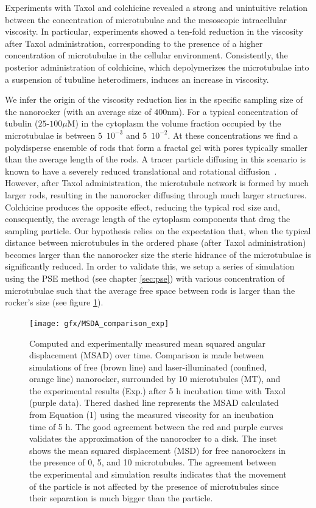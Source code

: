 \documentclass[ twoside,openright,titlepage,numbers=noenddot,%
headinclude,footinclude,cleardoublepage=empty,abstract=on,
BCOR=5mm,paper=b5,fontsize=11pt, dvipsnames
]{scrreprt}
\begin{document}
Experiments with Taxol and colchicine revealed a strong and unintuitive relation between the concentration of microtubulae and the mesoscopic intracellular viscosity. In particular, experiments showed a ten-fold reduction in the viscosity after Taxol administration, corresponding to the presence of a higher concentration of microtubulae in the cellular environment. Consistently, the posterior administration of colchicine, which depolymerizes the microtubulae into a suspension of tubuline heterodimers, induces an increase in viscosity.

We infer the origin of the viscosity reduction lies in the specific sampling size of the nanorocker (with an average size of $400$nm). For a typical concentration of tubulin ($25$-$100\mu$M) in the cytoplasm the volume fraction occupied by the microtubulae is between $5$~$10^{-3}$ and $5$~$10^{-2}$. At these concentrations we find a polydisperse ensemble of rods that form a fractal gel with pores typically smaller than the average length of the rods. A tracer particle diffusing in this scenario is known to have a severely reduced translational and rotational diffusion~\cite{Solomon2010,Alcazar2018}. However, after Taxol administration, the microtubule network is formed by much larger rods, resulting in the nanorocker diffusing through much larger structures. Colchicine produces the opposite effect, reducing the typical rod size and, consequently, the average length of the cytoplasm components that drag the sampling particle. Our hypothesis relies on the expectation that, when the typical distance between microtubules in the ordered phase (after Taxol administration) becomes larger than the nanorocker size the steric hidrance of the microtubulae is significantly reduced. In order to validate this, we setup a series of simulation using the \gls{PSE} method (see chapter \ref{sec:pse}) with various concentration of microtubulae such that the average free space between rods is larger than the rocker's size (see figure \ref{fig:msad}).
\begin{figure}[H]
  \centering
  \texttt{[image: gfx/MSDA\_comparison\_exp]}
  \caption{Computed and experimentally measured mean squared angular displacement (MSAD) over time. Comparison is made between simulations of free (brown line) and laser-illuminated (confined, orange line) nanorocker, surrounded by 10 microtubules (MT), and the experimental results (Exp.) after 5 h incubation time with Taxol (purple data). Thered dashed line represents the MSAD calculated from Equation (1) using the measured viscosity for an incubation time of 5 h. The good agreement between the red and purple curves validates the approximation of the nanorocker to a disk. The inset shows the mean squared displacement (MSD) for free nanorockers in the presence of 0, 5, and 10 microtubules. The agreement between the experimental and simulation results indicates that the movement of the particle is not affected by the presence of microtubules since their separation is much bigger than the particle.}
  \label{fig:msad}
\end{figure}
\end{document}

